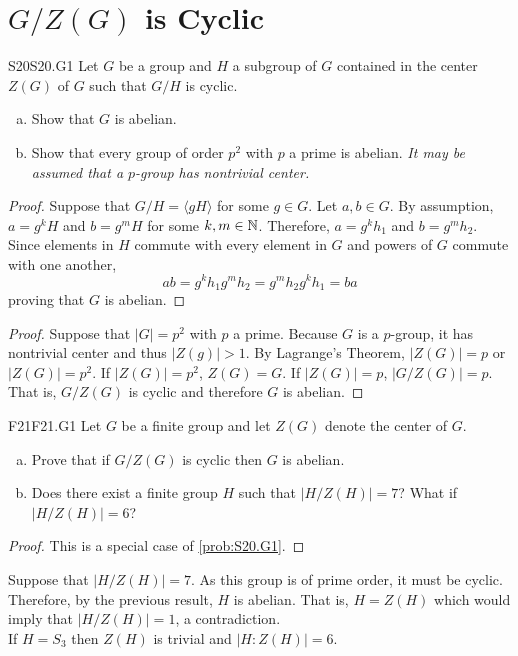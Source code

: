 \documentclass[../AlgebraQualSolutions.tex]{subfiles}
\begin{document}
\section{$G/Z(G)$ is Cyclic}

	\begin{prob}{S20}{S20.G1}
	Let $G$ be a group and $H$ a subgroup of $G$ contained in the center $Z(G)$ of $G$ such that $G/H$ is cyclic.
	\begin{enumerate}[(a)]
	\item Show that $G$ is abelian.
	\item Show that every group of order $p^2$ with $p$ a prime is abelian. \emph{It may be assumed that a $p$-group has nontrivial center.}
	\end{enumerate}
	\end{prob}
	
	\begin{proof}
	Suppose that $G/H = \langle gH \rangle$ for some $g \in G$. Let $a, b \in G$. By assumption, $a = g^kH$ and $b = g^mH$ for some $k,m \in \mathbb{N}$. Therefore, $a = g^kh_1$ and $b= g^m h_2$. Since elements in $H$ commute with every element in $G$ and powers of $G$ commute with one another,
		\[ab = g^kh_1g^mh_2 = g^mh_2g^k h_1 = ba \]
	proving that $G$ is abelian.
	\end{proof}
	
	\begin{proof}
	Suppose that $|G| = p^2$ with $p$ a prime. Because $G$ is a $p$-group, it has nontrivial center and thus $|Z(g)| > 1$. By Lagrange's Theorem, $|Z(G)| = p$ or $|Z(G)| = p^2$. If $|Z(G)| =p^2$, $Z(G) = G$. If $|Z(G)| = p$, $\left|G/Z(G) \right| = p$. That is, $G/Z(G)$ is cyclic and therefore $G$ is abelian.
	\end{proof}
	
	\begin{prob}{F21}{F21.G1}
	Let $G$ be a finite group and let $Z(G)$ denote the center of $G$.
	\begin{enumerate}[(a)]
	\item Prove that if $G/Z(G)$ is cyclic then $G$ is abelian.
	\item Does there exist a finite group $H$ such that $|H/Z(H)| = 7$? What if $|H/Z(H)| = 6$?
	\end{enumerate}
	\end{prob}
	
	\begin{proof}
	This is a special case of \ref{prob:S20.G1}.
	\end{proof}
	
	\begin{solution}
	Suppose that $|H/Z(H)| = 7$. As this group is of prime order, it must be cyclic. Therefore, by the previous result, $H$ is abelian. That is, $H = Z(H)$ which would imply that $|H/Z(H)| = 1$, a contradiction.\\
	
	If $H = S_3$ then $Z(H)$ is trivial and $|H: Z(H)| = 6$.
	\end{solution}
\end{document}
